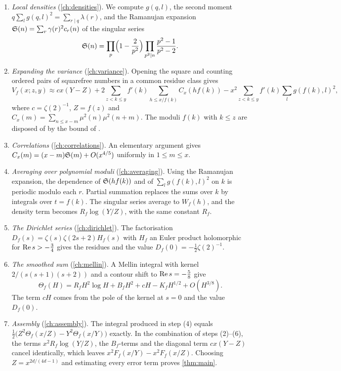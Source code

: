 \begin{enumerate}[label=(\arabic*)]
\item \emph{Local densities} (\cref{ch:densities}). We compute $g(q,l)$, the second moment $q\sum_lg(q,l)^2=\sum_{r\mid q}\lambda(r)$, and the Ramanujan expansion $\mathfrak S(n)=\sum_r\gamma(r)^2c_r(n)$ of the singular series
\[
\mathfrak S(n)=\prod_p\Bigl(1-\frac2{p^2}\Bigr)\prod_{p^2\mid n}\frac{p^2-1}{p^2-2}.
\]
\item \emph{Expanding the variance} (\cref{ch:variance}). Opening the square and counting ordered pairs of squarefree numbers in a common residue class gives
\[
V_f(x;z,y)\approx cx(Y-Z)+2\sum_{z<k\le y}f'(k)\sum_{h\le x/f(k)}C_x(hf(k))-x^2\sum_{z<k\le y}f'(k)\sum_{l}g(f(k),l)^2,
\]
where $c=\zeta(2)^{-1}$, $Z=f(z)$ and $C_x(m)=\sum_{n\le x-m}\mu^2(n)\mu^2(n+m)$. The moduli $f(k)$ with $k\le z$ are disposed of by the bound of \cite{bgpvw1998}.
\item \emph{Correlations} (\cref{ch:correlations}). An elementary argument gives $C_x(m)=(x-m)\mathfrak S(m)+O(x^{4/5})$ uniformly in $1\le m\le x$.
\item \emph{Averaging over polynomial moduli} (\cref{ch:averaging}). Using the Ramanujan expansion, the dependence of $\mathfrak S(hf(k))$ and of $\sum_lg(f(k),l)^2$ on $k$ is periodic modulo each $r$. Partial summation replaces the sums over $k$ by integrals over $t=f(k)$. The singular series average to $W_f(h)$, and the density term becomes $R_f\log(Y/Z)$, with the same constant $R_f$.
\item \emph{The Dirichlet series} (\cref{ch:dirichlet}). The factorisation $D_f(s)=\zeta(s)\zeta(2s+2)H_f(s)$ with $H_f$ an Euler product holomorphic for $\operatorname{Re} s>-\frac34$ gives the residues and the value $D_f(0)=-\frac12\zeta(2)^{-1}$.
\item \emph{The smoothed sum} (\cref{ch:mellin}). A Mellin integral with kernel $2/(s(s+1)(s+2))$ and a contour shift to $\operatorname{Re} s=-\frac58$ give
\[
\Theta_f(H)=R_fH^2\log H+B_fH^2+cH-K_fH^{1/2}+O(H^{3/8}).
\]
The term $cH$ comes from the pole of the kernel at $s=0$ and the value $D_f(0)$.
\item \emph{Assembly} (\cref{ch:assembly}). The integral produced in step (4) equals $\frac12\bigl(Z^2\Theta_f(x/Z)-Y^2\Theta_f(x/Y)\bigr)$ exactly. In the combination of steps (2)--(6), the terms $x^2R_f\log(Y/Z)$, the $B_f$-terms and the diagonal term $cx(Y-Z)$ cancel identically, which leaves $x^2F_f(x/Y)-x^2F_f(x/Z)$. Choosing $Z=x^{2d/(4d-1)}$ and estimating every error term proves \cref{thm:main}.
\end{enumerate}

